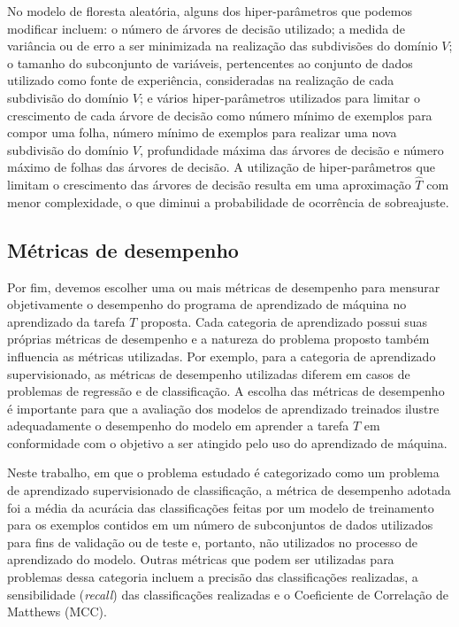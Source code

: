 No modelo de floresta aleatória, alguns dos hiper-parâmetros que podemos modificar incluem: o número de árvores de decisão utilizado; a medida de variância ou de erro a ser minimizada na realização das subdivisões do domínio $V$; o tamanho do subconjunto de variáveis, pertencentes ao conjunto de dados utilizado como fonte de experiência, consideradas na realização de cada subdivisão do domínio $V$; e vários hiper-parâmetros utilizados para limitar o crescimento de cada árvore de decisão como número mínimo de exemplos para compor uma folha, número mínimo de exemplos para realizar uma nova subdivisão do domínio $V$, profundidade máxima das árvores de decisão e número máximo de folhas das árvores de decisão. A utilização de hiper-parâmetros que limitam o crescimento das árvores de decisão resulta em uma aproximação $\hat{T}$ com menor complexidade, o que diminui a probabilidade de ocorrência de sobreajuste\cite[p.307]{statistical_learning}.

\subsection{Métricas de desempenho}

Por fim, devemos escolher uma ou mais métricas de desempenho para mensurar objetivamente o desempenho do programa de aprendizado de máquina no aprendizado da tarefa $T$ proposta. Cada categoria de aprendizado possui suas próprias métricas de desempenho e a natureza do problema proposto também influencia as métricas utilizadas. Por exemplo, para a categoria de aprendizado supervisionado, as métricas de desempenho utilizadas diferem em casos de problemas de regressão e de classificação. A escolha das métricas de desempenho é importante para que a avaliação dos modelos de aprendizado treinados ilustre adequadamente o desempenho do modelo em aprender a tarefa $T$ em conformidade com o objetivo a ser atingido pelo uso do aprendizado de máquina.

Neste trabalho, em que o problema estudado é categorizado como um problema de aprendizado supervisionado de classificação, a métrica de desempenho adotada foi a média da acurácia das classificações feitas por um modelo de treinamento para os exemplos contidos em um número de subconjuntos de dados utilizados para fins de validação ou de teste e, portanto, não utilizados no processo de aprendizado do modelo. Outras métricas que podem ser utilizadas para problemas dessa categoria incluem a precisão das classificações realizadas, a sensibilidade (\textit{recall}) das classificações realizadas e o Coeficiente de Correlação de Matthews (MCC).

